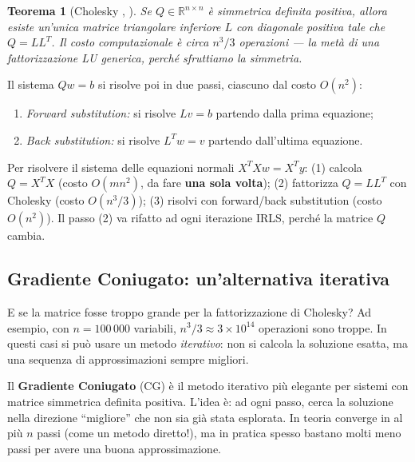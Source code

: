 \documentclass[a4paper,11pt]{article}
\newtheorem{theorem}{Teorema}[section]
\theoremstyle{definition}
\newcommand{\R}{\mathbb{R}}
\begin{document}
\begin{theorem}[Cholesky {\cite[Lecture~20]{nla-slides}, \cite[§1.6]{opt-notes}}]
Se $Q \in \R^{n\times n}$ è simmetrica definita positiva, allora esiste un'unica matrice triangolare inferiore $L$ con diagonale positiva tale che $Q = LL^T$. Il costo computazionale è circa $n^3/3$ operazioni --- la metà di una fattorizzazione LU generica, perché sfruttiamo la simmetria.
\end{theorem}

Il sistema $Qw = b$ si risolve poi in due passi, ciascuno dal costo $O(n^2)$:
\begin{enumerate}[nosep]
  \item \emph{Forward substitution:} si risolve $Lv = b$ partendo dalla prima equazione;
  \item \emph{Back substitution:} si risolve $L^Tw = v$ partendo dall'ultima equazione.
\end{enumerate}

\begin{riassunto}
Per risolvere il sistema delle equazioni normali $X^TXw = X^Ty$: (1) calcola $Q = X^TX$ (costo $O(mn^2)$, da fare \textbf{una sola volta}); (2) fattorizza $Q = LL^T$ con Cholesky (costo $O(n^3/3)$); (3) risolvi con forward/back substitution (costo $O(n^2)$). Il passo (2) va rifatto ad ogni iterazione IRLS, perché la matrice $Q$ cambia.
\end{riassunto}

\subsection{Gradiente Coniugato: un'alternativa iterativa}
\label{subsec:cg}

\begin{intuizione}
E se la matrice fosse troppo grande per la fattorizzazione di Cholesky? Ad esempio, con $n = 100\,000$ variabili, $n^3/3 \approx 3 \times 10^{14}$ operazioni sono troppe. In questi casi si può usare un metodo \emph{iterativo}: non si calcola la soluzione esatta, ma una sequenza di approssimazioni sempre migliori.

Il \textbf{Gradiente Coniugato} (CG) è il metodo iterativo più elegante per sistemi con matrice simmetrica definita positiva. L'idea è: ad ogni passo, cerca la soluzione nella direzione ``migliore'' che non sia già stata esplorata. In teoria converge in al più $n$ passi (come un metodo diretto!), ma in pratica spesso bastano molti meno passi per avere una buona approssimazione.
\end{intuizione}
\end{document}
